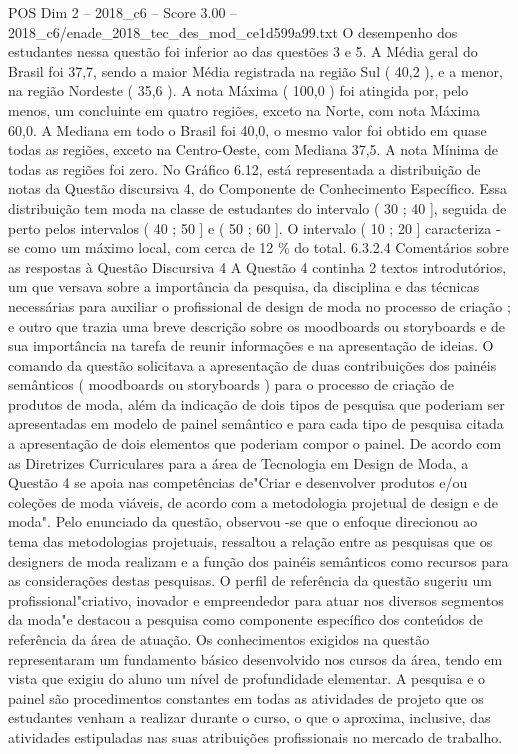 \begin{textsample}{POS Dim 2 – 2018\_c6 – Score 3.00 – 2018\_c6/enade\_2018\_tec\_des\_mod\_ce1d599a99.txt}
O desempenho dos estudantes nessa questão foi inferior ao das questões 3 e 5.
A Média geral do Brasil foi 37,7, sendo a maior Média registrada na região Sul ( 40,2 ), e a menor, na região Nordeste ( 35,6 ).
A nota Máxima ( 100,0 ) foi atingida por, pelo menos, um concluinte em quatro regiões, exceto na Norte, com nota Máxima 60,0.
A Mediana em todo o Brasil foi 40,0, o mesmo valor foi obtido em quase todas as regiões, exceto na Centro-Oeste, com Mediana 37,5.
A nota Mínima de todas as regiões foi zero.
No Gráfico 6.12, está representada a distribuição de notas da Questão discursiva 4, do Componente de Conhecimento Específico.
Essa distribuição tem moda na classe de estudantes do intervalo ( 30 ; 40 ], seguida de perto pelos intervalos ( 40 ; 50 ] e ( 50 ; 60 ].
O intervalo ( 10 ; 20 ] caracteriza -se como um máximo local, com cerca de 12 \% do total. 6.3.2.4 Comentários sobre as respostas à Questão Discursiva 4 A Questão 4 continha 2 textos introdutórios, um que versava sobre a importância da pesquisa, da disciplina e das técnicas necessárias para auxiliar o profissional de design de moda no processo de criação ; e outro que trazia uma breve descrição sobre os moodboards ou storyboards e de sua importância na tarefa de reunir informações e na apresentação de ideias.
O comando da questão solicitava a apresentação de duas contribuições dos painéis semânticos ( moodboards ou storyboards ) para o processo de criação de produtos de moda, além da indicação de dois tipos de pesquisa que poderiam ser apresentadas em modelo de painel semântico e para cada tipo de pesquisa citada a apresentação de dois elementos que poderiam compor o painel.
De acordo com as Diretrizes Curriculares para a área de Tecnologia em Design de Moda, a Questão 4 se apoia nas competências de"Criar e desenvolver produtos e/ou coleções de moda viáveis, de acordo com a metodologia projetual de design e de moda".
Pelo enunciado da questão, observou -se que o enfoque direcionou ao tema das metodologias projetuais, ressaltou a relação entre as pesquisas que os designers de moda realizam e a função dos painéis semânticos como recursos para as considerações destas pesquisas.
O perfil de referência da questão sugeriu um profissional"criativo, inovador e empreendedor para atuar nos diversos segmentos da moda"e destacou a pesquisa como componente específico dos conteúdos de referência da área de atuação.
Os conhecimentos exigidos na questão representaram um fundamento básico desenvolvido nos cursos da área, tendo em vista que exigiu do aluno um nível de profundidade elementar.
A pesquisa e o painel são procedimentos constantes em todas as atividades de projeto que os estudantes venham a realizar durante o curso, o que o aproxima, inclusive, das atividades estipuladas nas suas atribuições profissionais no mercado de trabalho.

\end{textsample}
